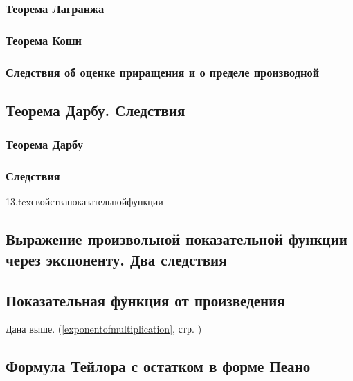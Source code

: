 \subsubsection{Теорема Лагранжа}
\subsubsection{Теорема Коши}
\subsubsection{Следствия об оценке приращения и о пределе производной}

\subsection{Теорема Дарбу. Следствия}
\subsubsection{Теорема Дарбу}
\subsubsection{Следствия}

{13.tex}{свойствапоказательнойфункции}

\subsection{Выражение произвольной показательной функции через экспоненту. Два следствия}

\subsection{Показательная функция от произведения}
Дана выше. (\ref{exponentofmultiplication}, стр. \pageref{exponentofmultiplication})

\subsection{Формула Тейлора с остатком в форме Пеано}


